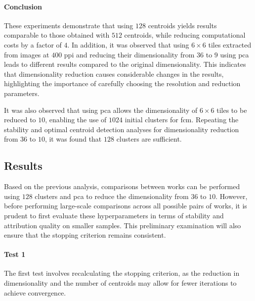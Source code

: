 \begin{toReview}
	\paragraph{Conclusion}
	These experiments demonstrate that using $128$ centroids yields results comparable to those obtained with $512$ centroids, while reducing computational costs by a factor of $4$. In addition, it was observed that using $6\times6$ tiles extracted from images at $400$ \gls{ppi} and reducing their dimensionality from $36$ to $9$ using \gls{pca} leads to different results compared to the original dimensionality. This indicates that dimensionality reduction causes considerable changes in the results, highlighting the importance of carefully choosing the resolution and reduction parameters.

	\noindent It was also observed that using \gls{pca} allows the dimensionality of $6\times6$ tiles to be reduced to $10$, enabling the use of $1024$ initial clusters for \gls{fcm}. Repeating the stability and optimal centroid detection analyses for dimensionality reduction from $36$ to $10$, it was found that $128$ clusters are sufficient.

	\subsection{Results}
	Based on the previous analysis, comparisons between works can be performed using $128$ clusters and \gls{pca} to reduce the dimensionality from $36$ to $10$. However, before performing large-scale comparisons across all possible pairs of works, it is prudent to first evaluate these hyperparameters in terms of stability and attribution quality on smaller samples. This preliminary examination will also ensure that the stopping criterion remains consistent.

	\paragraph{Test 1}
	The first test involves recalculating the stopping criterion, as the reduction in dimensionality and the number of centroids may allow for fewer iterations to achieve convergence.


\end{toReview}
